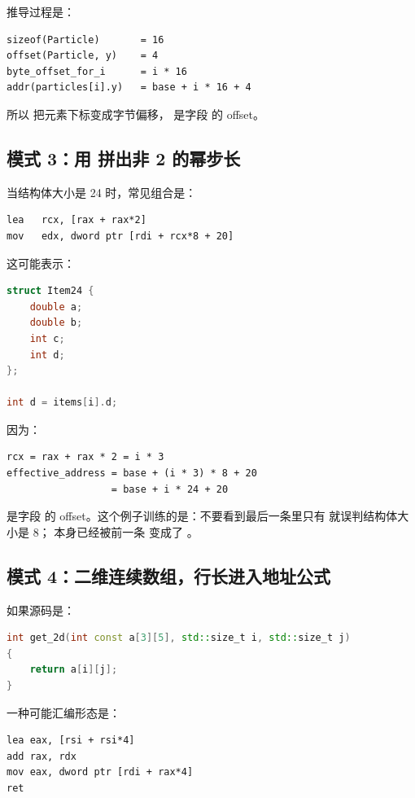 推导过程是：

\begin{lstlisting}
sizeof(Particle)       = 16
offset(Particle, y)    = 4
byte_offset_for_i      = i * 16
addr(particles[i].y)   = base + i * 16 + 4
\end{lstlisting}

所以  把元素下标变成字节偏移， 是字段  的 offset。

\subsection{模式 3：用  拼出非 2 的幂步长}

当结构体大小是 24 时，常见组合是：

\begin{lstlisting}
lea   rcx, [rax + rax*2]
mov   edx, dword ptr [rdi + rcx*8 + 20]
\end{lstlisting}

这可能表示：

\begin{lstlisting}[language=C++]
struct Item24 {
    double a;
    double b;
    int c;
    int d;
};

int d = items[i].d;
\end{lstlisting}

因为：

\begin{lstlisting}
rcx = rax + rax * 2 = i * 3
effective_address = base + (i * 3) * 8 + 20
                  = base + i * 24 + 20
\end{lstlisting}

 是字段  的 offset。这个例子训练的是：不要看到最后一条里只有  就误判结构体大小是 8； 本身已经被前一条  变成了 。

\subsection{模式 4：二维连续数组，行长进入地址公式}

如果源码是：

\begin{lstlisting}[language=C++]
int get_2d(int const a[3][5], std::size_t i, std::size_t j)
{
    return a[i][j];
}
\end{lstlisting}

一种可能汇编形态是：

\begin{lstlisting}
lea eax, [rsi + rsi*4]
add rax, rdx
mov eax, dword ptr [rdi + rax*4]
ret
\end{lstlisting}

